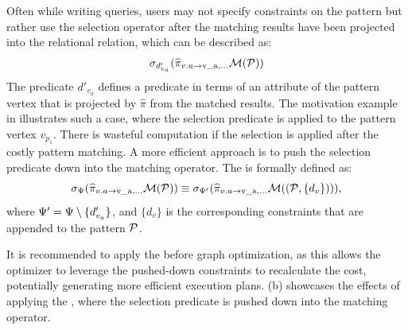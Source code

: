 Often while writing queries, users may not specify constraints on the pattern but rather use the selection operator after the matching results have been projected into the relational relation, which can be described as:
\[
\sigma_{d'_{v_a}} (\widehat{\pi}_{v.a \rightarrow \text{v\_a}, \ldots} \mathcal{M}(\mathcal{P}))
\]
The predicate $d'_{v_a}$ defines a predicate in terms of an attribute of the pattern vertex that is projected by $\widehat{\pi}$ from the matched results. The motivation example in  illustrates such a case, where the selection predicate  is applied to the pattern vertex $v_{p_1}$.
There is wasteful computation if the selection is applied after the costly pattern matching. A more efficient approach is to push the selection predicate down into the matching operator.
The \filterrule is formally defined as:
\begin{equation*}
\sigma_{\Psi} (\widehat{\pi}_{v.a \rightarrow \text{v\_a}, \ldots} \mathcal{M}(\mathcal{P})) \\
\equiv \sigma_{\Psi'} (\widehat{\pi}_{v.a \rightarrow \text{v\_a}, \ldots} \mathcal{M}((\mathcal{P}, \{d_v\}))),
\end{equation*}
where $\Psi' = \Psi \setminus \{d'_{v_a}\}$, and $\{d_v\}$ is the corresponding constraints that are appended to the pattern $\mathcal{P}$.

It is recommended to apply the \filterrule before graph optimization, as this allows the optimizer to leverage the pushed-down constraints to recalculate the cost, potentially generating more efficient execution plans. (b) showcases the effects of applying the \filterrule, where the selection predicate  is pushed down into the matching operator.

